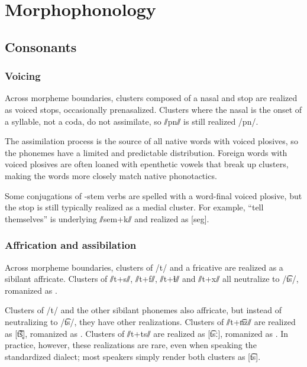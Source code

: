 \setchapterpreamble[u]{\margintoc}
\chapter{Morphophonology}
\section{Consonants} 
\subsection{Voicing} \label{sub:voicing}
Across morpheme boundaries, clusters composed of a nasal and stop are realized as voiced stops, occasionally prenasalized.  Clusters where the nasal is the onset of a syllable, not a coda, do not assimilate, so ⫽pn⫽ is still realized /pn/. 

The assimilation process is the source of all native words with voiced plosives, so the phonemes have a limited and predictable distribution.  Foreign words with voiced plosives are often loaned with epenthetic vowels that break up clusters, making the words more closely match native phonotactics. %

Some conjugations of -stem verbs are spelled with a word-final voiced plosive, but the stop is still typically realized as a medial cluster. For example,  “tell themselves” is underlying ⫽sem+k⫽ and realized as [seg]. 

\subsection{Affrication and assibilation} \label{sub:affrication}
Across morpheme boundaries, clusters of /t/ and a fricative are realized as a sibilant affricate. Clusters of ⫽t+s⫽, ⫽t+f⫽, ⫽t+ɬ⫽ and ⫽t+x⫽ all neutralize to /t͡s/, romanized as . 

Clusters of /t/ and the other sibilant phonemes also affricate, but instead of neutralizing to /t͡s/, they have other realizations. Clusters of ⫽t+n͡z⫽ are realized as [t͡s̞̃], romanized as .  Clusters of ⫽t+ts⫽ are realized as [t͡sː], romanized as . In practice, however, these realizations are rare, even when speaking the standardized dialect; most speakers simply render both clusters as [t͡s].

